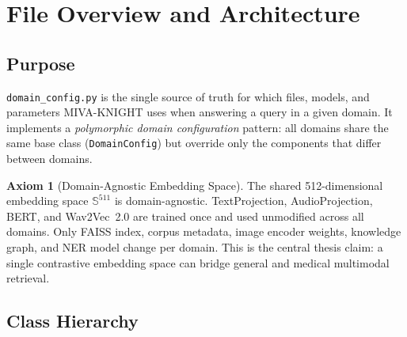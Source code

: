 \documentclass[12pt,a4paper]{article}
\theoremstyle{definition}
\newtheorem{axiom}[theorem]{Axiom}
\theoremstyle{remark}
\begin{document}
\tableofcontents
\newpage

\section{File Overview and Architecture}

\subsection{Purpose}

\texttt{domain\_config.py} is the single source of truth for which
files, models, and parameters MIVA-KNIGHT uses when answering a query
in a given domain.
It implements a \emph{polymorphic domain configuration} pattern: all domains
share the same base class (\texttt{DomainConfig}) but override only the
components that differ between domains.

\begin{axiom}[Domain-Agnostic Embedding Space]
The shared 512-dimensional embedding space $\mathbb{S}^{511}$ is
domain-agnostic.  TextProjection, AudioProjection, BERT, and Wav2Vec~2.0
are trained once and used unmodified across all domains.
Only FAISS index, corpus metadata, image encoder weights, knowledge graph,
and NER model change per domain.
This is the central thesis claim: a single contrastive embedding space can
bridge general and medical multimodal retrieval.
\end{axiom}

\subsection{Class Hierarchy}
\end{document}
